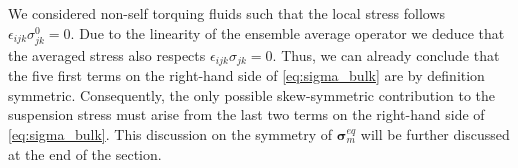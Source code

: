 We considered non-self torquing fluids such that the local stress follows  $\epsilon_{ijk} \sigma_{jk}^0 = 0$. 
Due to the linearity of the ensemble average operator we deduce that the averaged stress also respects $\epsilon_{ijk} \sigma_{jk} =0 $. 
Thus, we can already conclude that the five first terms on the right-hand side of \ref{eq:sigma_bulk} are by definition symmetric. 
Consequently, the only possible skew-symmetric contribution to the suspension stress must arise from the last two terms on the right-hand side of \ref{eq:sigma_bulk}.  
This discussion on the symmetry of $\bm\sigma^{eq}_m$ will be further discussed at the end of the section. 



